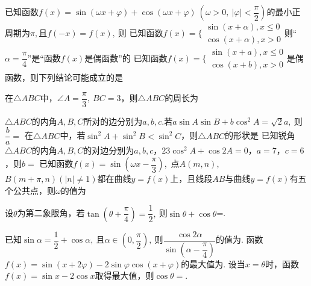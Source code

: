 \begin{questions}
\qs 已知函数$f(x)=\sin (\omega x +\varphi)+\cos (\omega x+\varphi)\ \left(\omega>0,\ \left|\varphi\right|<\dfrac{\pi}{2}\right)$的最小正周期为$ \pi , $且$ f(-x)=f(x),\  $则\xx
{}
\qs 已知函数$f(x)=\Bigg\{\begin{aligned}
\sin(x+\alpha),x\le 0\\\cos (x+\alpha),x>0
\end{aligned}$则“$ \alpha=\dfrac{\pi}{4} $”是“函数$f(x)$是偶函数”的\xx
{}
\qs 已知函数$f(x)=\Bigg\{\begin{aligned}
\sin(x+a),x\le 0\\\cos (x+b),x>0
\end{aligned}$是偶函数，则下列结论可能成立的是\xx




\qs 在$\triangle ABC$中，$ \angle A=\dfrac{\pi}{3},\ BC=3 $，则$ \triangle ABC $的周长为\xx
{}

\qs $\triangle ABC$的内角$ A,B,C $所对的边分别为$ a,b,c $.若$ a\sin A\sin B+b\cos^2A=\sqrt{2}a,\  $则$ \dfrac{b}{a}=$\xx
{}
\qs 在$ \triangle ABC $中，若$ \sin ^2A+\sin^2 B<\sin ^2C $，则$ \triangle ABC $的形状是\xx
{}
\qs 已知锐角$\triangle ABC$的内角$A,B,C$的对边分别为$a,b,c$，$23\cos^2A+\cos 2A=0$，$a=7$，$c=6$，则$b=$\xx
{}
\qs 已知函数$f(x)=\sin \left(\omega x-\dfrac{\pi}{3}\right)$,\ 点$ A(m,n) $,\ $ B(m+\pi,n) (\left|n\right|\ne 1)$都在曲线$ y=f(x) $上，且线段$ AB $与曲线$ y=f(x) $有五个公共点，则$ \omega $的值为\xx
{}


\qs 设$\theta$为第二象限角，若$ \tan\left(\theta +\dfrac{\pi}{4}\right)=\dfrac{1}{2},\  $则$ \sin \theta+\cos \theta $=\tk.

\qs 已知$\sin \alpha=\dfrac{1}{2}+\cos \alpha,\ $且$ \alpha\in \left(0,\dfrac{\pi}{2}\right),\  $则$ \dfrac{\cos 2\alpha}{\sin \left(\alpha-\dfrac{\pi}{4}\right)} $的值为\tk.
\question 函数$f(x)=\sin \left(x+2\varphi\right)-2\sin \varphi \cos(x+\varphi)$的最大值为\tk.
\question 设当$x=\theta$时，函数$f(x)=\sin x-2\cos x$取得最大值，则$\cos \theta=$\tk.


\end{questions}
